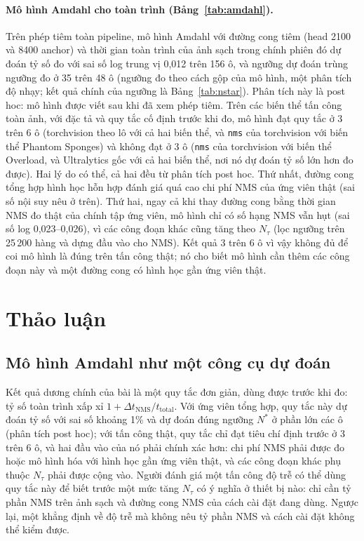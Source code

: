 \documentclass[12pt,a4paper]{article}
\newcommand{\Ntau}{N_{\tau}}
\begin{document}
\paragraph{Mô hình Amdahl cho toàn trình (Bảng~\ref{tab:amdahl}).}
Trên phép tiêm toàn pipeline, mô hình Amdahl với đường cong tiêm (head 2100 và 8400 anchor) và thời gian toàn trình của ảnh sạch trong chính phiên đó dự đoán tỷ số đo với sai số log trung vị 0,012 trên 156 ô, và ngưỡng dự đoán trùng ngưỡng đo ở 35 trên 48 ô (ngưỡng đo theo cách gộp của mô hình, một phân tích độ nhạy; kết quả chính của ngưỡng là Bảng~\ref{tab:nstar}). Phân tích này là post hoc: mô hình được viết sau khi đã xem phép tiêm. Trên các biến thể tấn công toàn ảnh, với đặc tả và quy tắc cố định trước khi đo, mô hình đạt quy tắc ở 3 trên 6 ô (torchvision theo lô với cả hai biến thể, và \texttt{nms} của torchvision với biến thể Phantom Sponges) và không đạt ở 3 ô (\texttt{nms} của torchvision với biến thể Overload, và Ultralytics gốc với cả hai biến thể, nơi nó dự đoán tỷ số lớn hơn đo được). Hai lý do có thể, cả hai đều từ phân tích post hoc. Thứ nhất, đường cong tổng hợp hình học hỗn hợp đánh giá quá cao chi phí NMS của ứng viên thật (sai số nội suy nêu ở trên). Thứ hai, ngay cả khi thay đường cong bằng thời gian NMS đo thật của chính tập ứng viên, mô hình chỉ có số hạng NMS vẫn hụt (sai số log 0,023--0,026), vì các công đoạn khác cũng tăng theo $\Ntau$ (lọc ngưỡng trên 25\,200 hàng và dựng đầu vào cho NMS). Kết quả 3 trên 6 ô vì vậy không đủ để coi mô hình là đúng trên tấn công thật; nó cho biết mô hình cần thêm các công đoạn này và một đường cong có hình học gần ứng viên thật.



\section{Thảo luận}
\label{sec:discussion}
\subsection{Mô hình Amdahl như một công cụ dự đoán}
Kết quả dương chính của bài là một quy tắc đơn giản, dùng được trước khi đo: tỷ số toàn trình xấp xỉ $1 + \Delta t_{\mathrm{NMS}}/t_{\mathrm{total}}$. Với ứng viên tổng hợp, quy tắc này dự đoán tỷ số với sai số khoảng 1\% và dự đoán đúng ngưỡng $N^{*}$ ở phần lớn các ô (phân tích post hoc); với tấn công thật, quy tắc chỉ đạt tiêu chí định trước ở 3 trên 6 ô, và hai đầu vào của nó phải chính xác hơn: chi phí NMS phải được đo hoặc mô hình hóa với hình học gần ứng viên thật, và các công đoạn khác phụ thuộc $\Ntau$ phải được cộng vào. Người đánh giá một tấn công độ trễ có thể dùng quy tắc này để biết trước một mức tăng $\Ntau$ có ý nghĩa ở thiết bị nào: chỉ cần tỷ phần NMS trên ảnh sạch và đường cong NMS của cách cài đặt đang dùng. Ngược lại, một khẳng định về độ trễ mà không nêu tỷ phần NMS và cách cài đặt không thể kiểm được.
\end{document}
